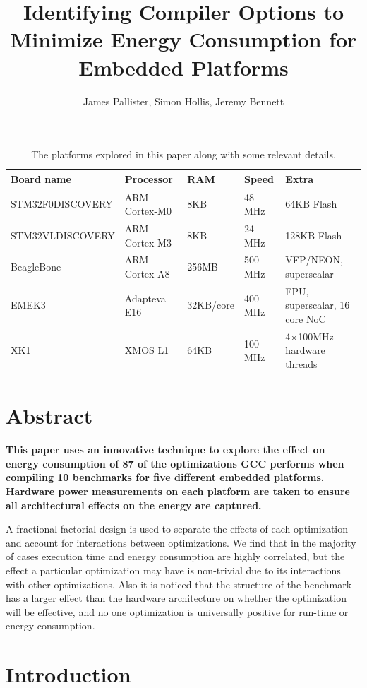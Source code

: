 \documentclass[twocolumn]{article}
\title{\bfseries\fontsize{22}{1}\selectfont Identifying Compiler Options to Minimize Energy Consumption for Embedded Platforms}
\author{James Pallister, Simon Hollis, Jeremy Bennett}
\let\oldcaption\caption
\renewcommand{\caption}[1]{\oldcaption{\textup{#1}}}
\begin{document}
\maketitle
\begin{table}[!hbt]
	\centering
	\begin{tabular}{l l l l l}
		\textbf{Board name} & \textbf{Processor} & \textbf{RAM} & \textbf{Speed} & \textbf{Extra} \\
		\hline
		STM32F0DISCOVERY	& ARM Cortex-M0 		& 8KB		& 48 MHz		  & 64KB Flash\\
		STM32VLDISCOVERY	& ARM Cortex-M3 		& 8KB		& 24 MHz		  & 128KB Flash\\
		BeagleBone			& ARM Cortex-A8 		& 256MB		& 500 MHz		  & VFP/NEON, superscalar\\
		EMEK3				& Adapteva E16 			& 32KB/core & 400 MHz		  & FPU, superscalar, 16 core NoC\\
		XK1					& XMOS L1 				& 64KB		& 100 MHz 		& 4$\times$100MHz hardware threads \\
	\end{tabular}
	\caption{The platforms explored in this paper along with some relevant details.}
	\label{Table:Platforms}
\end{table}

\section{Abstract}

{\bfseries
This paper uses an innovative technique to explore the effect on energy consumption of 87 of the optimizations GCC performs when compiling 10 benchmarks for five different embedded platforms. Hardware power measurements on each platform are taken to ensure all architectural effects on the energy are captured.

A fractional factorial design is used to separate the effects of each optimization and account for interactions between optimizations. We find that in the majority of cases execution time and energy consumption are highly correlated, but the effect a particular optimization may have is non-trivial due to its interactions with other optimizations. Also it is noticed that the structure of the benchmark has a larger effect than the hardware architecture on whether the optimization will be effective, and no one optimization is universally positive for run-time or energy consumption.
}

\section{Introduction}
\end{document}
